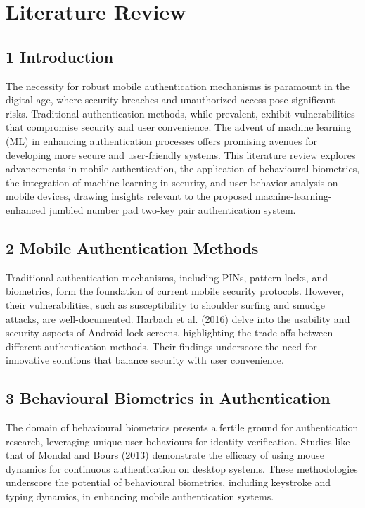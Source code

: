 \documentclass{article}
\begin{document}
\section*{Literature Review}

\subsection*{1 Introduction}

The necessity for robust mobile authentication mechanisms is paramount in the digital age, where security breaches and unauthorized access pose significant risks. Traditional authentication methods, while prevalent, exhibit vulnerabilities that compromise security and user convenience. The advent of machine learning (ML) in enhancing authentication processes offers promising avenues for developing more secure and user-friendly systems. This literature review explores advancements in mobile authentication, the application of behavioural biometrics, the integration of machine learning in security, and user behavior analysis on mobile devices, drawing insights relevant to the proposed machine-learning-enhanced jumbled number pad two-key pair authentication system.

\subsection*{2 Mobile Authentication Methods}

Traditional authentication mechanisms, including PINs, pattern locks, and biometrics, form the foundation of current mobile security protocols. However, their vulnerabilities, such as susceptibility to shoulder surfing and smudge attacks, are well-documented. Harbach et al. (2016) delve into the usability and security aspects of Android lock screens, highlighting the trade-offs between different authentication methods. Their findings underscore the need for innovative solutions that balance security with user convenience.

\subsection*{3 Behavioural Biometrics in Authentication}

The domain of behavioural biometrics presents a fertile ground for authentication research, leveraging unique user behaviours for identity verification. Studies like that of Mondal and Bours (2013) demonstrate the efficacy of using mouse dynamics for continuous authentication on desktop systems. These methodologies underscore the potential of behavioural biometrics, including keystroke and typing dynamics, in enhancing mobile authentication systems.
\end{document}
